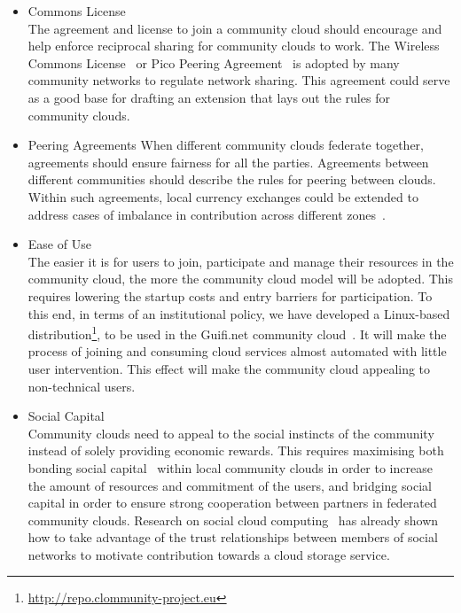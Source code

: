 \begin{itemize}

\item Commons License
\\
The agreement and license to join a community cloud should encourage and help enforce reciprocal sharing for community clouds to work.
The Wireless Commons License~\cite{WCL2010} or Pico Peering Agreement~\cite{PicoPeering2005} is adopted by many community networks to regulate network sharing. 
This agreement could serve as a good base for drafting an extension that lays out the rules for community clouds.

\item Peering Agreements
When different community clouds federate together, agreements should ensure fairness for all the parties. 
Agreements between different communities should describe the rules for peering between clouds. 
Within such agreements, local currency exchanges could be extended to address cases of imbalance in contribution across different zones~\cite{Punceva2013}.


\item Ease of Use
\\
The easier it is for users to join, participate and manage their resources in the community cloud, the more the community cloud model will be adopted.
This requires lowering the startup costs and entry barriers for participation.
To this end, in terms of an institutional policy, we have developed a Linux-based distribution\footnote{\url{http://repo.clommunity-project.eu}}, to be used in the Guifi.net community cloud~\cite{Jimenez2014}. 
It will make the process of joining and consuming cloud services almost automated with little user intervention. 
This effect will make the community cloud appealing to non-technical users.

\item Social Capital
\\
Community clouds need to appeal to the social instincts of the community instead of solely providing economic rewards.
This requires maximising both bonding social capital~\cite{Coleman1988} within local community clouds in order to increase the amount of resources and commitment of the users, and bridging social capital in order to ensure strong cooperation between partners in federated community clouds. %
Research on social cloud computing~\cite{Chard2012} has already shown how to take advantage of the trust relationships between members of social networks to motivate contribution towards a cloud storage service.



\end{itemize}
